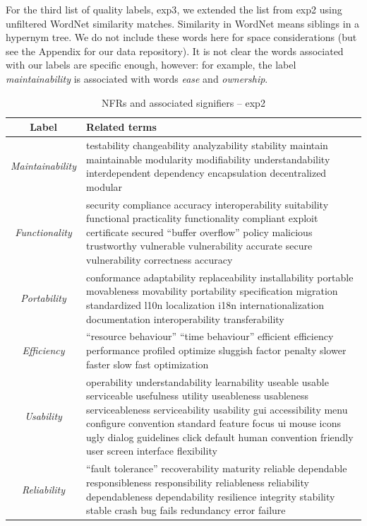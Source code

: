 \documentclass[]{sig-alternate}
\begin{document}
For the third list of quality labels,  \textsf{exp3}, we extended the list from \textsf{exp2} using unfiltered WordNet similarity matches. Similarity in WordNet means siblings in a hypernym tree. We do not include these words here for space considerations (but see the Appendix for our data repository). It is not clear the words associated with our labels are specific enough, however: for example, the label \emph{maintainability} is associated with words \emph{ease} and \emph{ownership}.

\begin{table}
	\centering
\begin{tabular}{c|p{9cm}}
\toprule
\textbf{Label} & \textbf{Related terms} \\
\midrule
\emph{Maintainability} &
testability changeability analyzability stability maintain maintainable modularity modifiability understandability interdependent dependency encapsulation decentralized modular\\ \hline
\emph{Functionality} &
security compliance accuracy interoperability suitability functional practicality functionality compliant exploit certificate secured ``buffer overflow'' policy malicious trustworthy vulnerable vulnerability accurate secure vulnerability correctness accuracy\\ \hline
\emph{Portability} &
conformance adaptability replaceability installability portable movableness movability portability specification migration standardized l10n localization i18n internationalization documentation interoperability transferability\\ \hline
\emph{Efficiency} &
``resource behaviour'' ``time behaviour'' efficient efficiency performance profiled optimize sluggish factor penalty slower faster slow fast optimization\\ \hline
\emph{Usability} &
operability understandability learnability useable usable serviceable usefulness utility useableness usableness serviceableness serviceability usability gui accessibility menu configure convention standard feature focus ui mouse icons ugly dialog guidelines click default human convention friendly user screen interface flexibility\\ \hline
\emph{Reliability} &
``fault tolerance'' recoverability maturity reliable dependable responsibleness responsibility reliableness reliability dependableness dependability resilience integrity stability stable crash bug fails redundancy error failure\\ 
\bottomrule
\end{tabular}
	\caption{NFRs and associated signifiers -- \textsf{exp2}}
	\label{tbl:wnsig}

\end{table}
\end{document}
